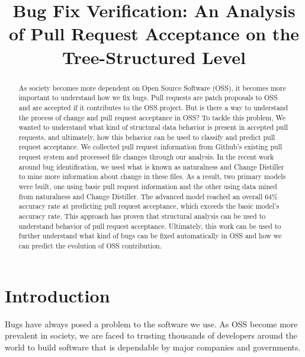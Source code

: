 \documentclass[10pt, conference]{IEEEtran}
\begin{document}
%
\title{Bug Fix Verification: An Analysis of Pull Request Acceptance on the Tree-Structured Level}



\author{
}
\maketitle


\begin{abstract}
As society becomes more dependent on Open Source Software (OSS), it becomes more important to understand how we fix bugs. Pull requests are patch proposals to OSS and are accepted if it contributes to the OSS project. But is there a way to understand the process of change and pull request acceptance in OSS? To tackle this problem, We wanted to understand what kind of structural data behavior is present in accepted pull requests, and ultimately, how this behavior can be used to classify and predict pull request acceptance. We collected pull request information from Github's existing pull request system and processed file changes through our analysis. In the recent work around bug identification, we used what is known as naturalness and Change Distiller to mine more information about change in these files. As a result, two primary models were built, one using basic pull request information and the other using data mined from naturalness and Change Distiller. The advanced model reached an overall 64\% accuracy rate at predicting pull request acceptance, which exceeds the basic model's accuracy rate. This approach has proven that structural analysis can be used to understand behavior of pull request acceptance. Ultimately, this work can be used to further understand what kind of bugs can be fixed automatically in OSS and how we can predict the evolution of OSS contribution.
\end{abstract}
\IEEEpeerreviewmaketitle

\section{Introduction}
Bugs have always posed a problem to the software we use. As OSS become more prevalent in society, we are faced to trusting thousands of developers around the world to build software that is dependable by major companies and governments. 
\end{document}
